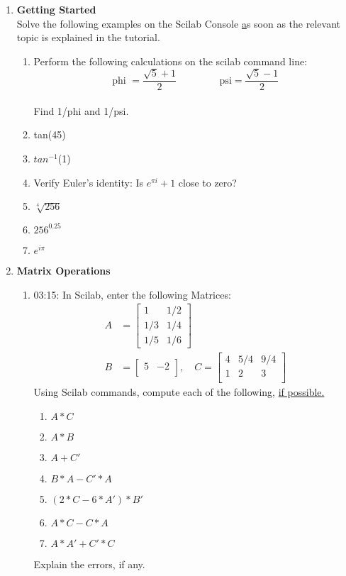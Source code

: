 \documentclass[12pt,a4paper]{article}
\newenvironment{enumcpt}{\begin{enumerate} \topsep -3mm \partopsep -3mm 
                        \parsep -3mm
                        \itemsep -0mm \leftmargin -1in \rightmargin -3mm
                        }{\end{enumerate}}
\begin{document}
\begin{multicols}{2}
\begin{enumcpt}
\item {\bf Getting Started }\\Solve the following examples on the Scilab Console {\underline as soon as} the relevant topic is explained in the tutorial.
	\begin{enumcpt}
	\item Perform the following calculations on the scilab command line:
\[
\mbox{phi } = \frac{\sqrt{5}+1}{2} \qquad \qquad \mbox{ psi} = \frac{\sqrt{5}-1}{2}
\]
\\Find 1/phi and 1/psi.
\item tan(45)
\item $tan^{-1}$(1)
\item Verify Euler's identity: Is $e^{\pi i}+ 1$ close to zero?\\
\item $\sqrt[4]{256}$
\item $256^{0.25}$
\item $e^{i\pi}$
\end{enumcpt}

\item {\bf Matrix Operations}
\begin{enumcpt}
\item 03:15: In Scilab, enter the following Matrices: 
\begin{align*}
A&=\begin{bmatrix}
1 & 1/2\\
1/3 & 1/4\\
1/5 & 1/6
\end{bmatrix} \\
B& =\begin{bmatrix}
5 & -2\\
\end{bmatrix},
\quad
C=\begin{bmatrix}
4 & 5/4 & 9/4\\
1 & 2 & 3\\
\end{bmatrix}
\end{align*}
Using Scilab commands, compute each of the following, \underline{if possible.}
\begin{enumcpt}
\item $A*C$
\item $A*B$
\item $A+C'$
\item $B*A - C'*A$
\item $(2*C - 6*A')*B'$
\item $A*C - C*A$
\item $A*A' + C'*C$
\end{enumcpt} 
Explain the errors, if any.


\end{enumcpt}
\end{enumcpt}
\end{multicols}
\end{document}
